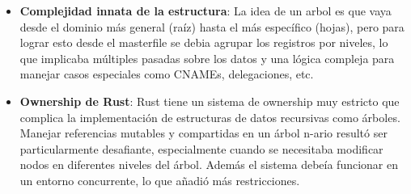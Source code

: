 \begin{itemize}
    \item \textbf{Complejidad innata de la estructura}: La idea de un arbol es que vaya desde el dominio más general (raíz) hasta el más específico (hojas), pero para lograr esto desde el masterfile se debia 
     agrupar los registros por niveles, lo que implicaba múltiples pasadas sobre los datos y una lógica compleja para manejar casos especiales como CNAMEs, delegaciones, etc.

    \item \textbf{Ownership de Rust}: Rust tiene un sistema de ownership muy estricto que complica la implementación de estructuras de datos recursivas como árboles. Manejar referencias mutables y compartidas en un árbol n-ario
     resultó ser particularmente desafiante, especialmente cuando se necesitaba modificar nodos en diferentes niveles del árbol. Además el sistema debeía funcionar en un entorno concurrente, lo que añadió más 
     restricciones.
\end{itemize}





